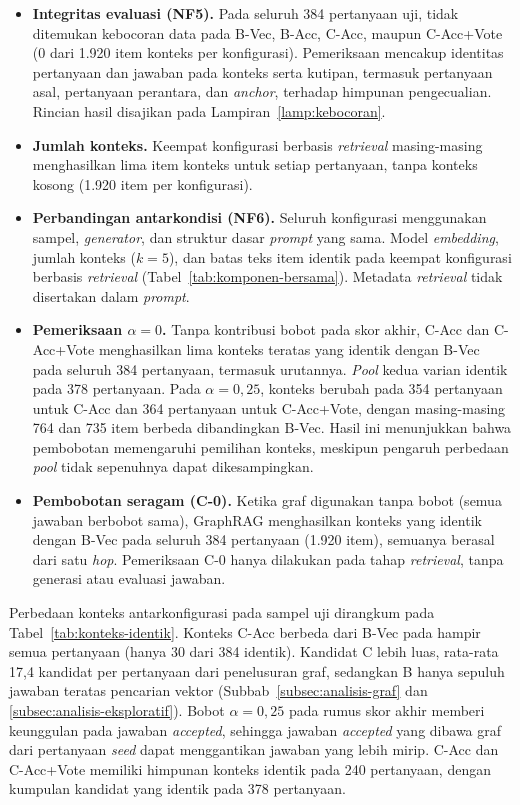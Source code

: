 \begin{itemize}
   \item \textbf{Integritas evaluasi (NF5).} Pada seluruh 384 pertanyaan uji, tidak ditemukan kebocoran data pada B-Vec, B-Acc, C-Acc, maupun C-Acc+Vote (0 dari 1.920 item konteks per konfigurasi). Pemeriksaan mencakup identitas pertanyaan dan jawaban pada konteks serta kutipan, termasuk pertanyaan asal, pertanyaan perantara, dan \emph{anchor}, terhadap himpunan pengecualian. Rincian hasil disajikan pada Lampiran~\ref{lamp:kebocoran}.
   
   \item \textbf{Jumlah konteks.} Keempat konfigurasi berbasis \emph{retrieval} masing-masing menghasilkan lima item konteks untuk setiap pertanyaan, tanpa konteks kosong (1.920 item per konfigurasi).
   
   
   \item \textbf{Perbandingan antarkondisi (NF6).} Seluruh konfigurasi menggunakan sampel, \emph{generator}, dan struktur dasar \emph{prompt} yang sama. Model \emph{embedding}, jumlah konteks ($k=5$), dan batas teks item identik pada keempat konfigurasi berbasis \emph{retrieval} (Tabel~\ref{tab:komponen-bersama}). Metadata \emph{retrieval} tidak disertakan dalam \emph{prompt}.
   
   \item \textbf{Pemeriksaan $\alpha=0$.} Tanpa kontribusi bobot pada skor akhir, C-Acc dan C-Acc+Vote menghasilkan lima konteks teratas yang identik dengan B-Vec pada seluruh 384 pertanyaan, termasuk urutannya. \emph{Pool} kedua varian identik pada 378 pertanyaan. Pada $\alpha=0{,}25$, konteks berubah pada 354 pertanyaan untuk C-Acc dan 364 pertanyaan untuk C-Acc+Vote, dengan masing-masing 764 dan 735 item berbeda dibandingkan B-Vec. Hasil ini menunjukkan bahwa pembobotan memengaruhi pemilihan konteks, meskipun pengaruh perbedaan \emph{pool} tidak sepenuhnya dapat dikesampingkan.
  
   \item \textbf{Pembobotan seragam (C-0).} Ketika graf digunakan tanpa bobot (semua jawaban berbobot sama), GraphRAG menghasilkan konteks yang identik dengan B-Vec pada seluruh 384 pertanyaan (1.920 item), semuanya berasal dari satu \emph{hop}. Pemeriksaan C-0 hanya dilakukan pada tahap \emph{retrieval}, tanpa generasi atau evaluasi jawaban.
\end{itemize}

Perbedaan konteks antarkonfigurasi pada sampel uji dirangkum pada Tabel~\ref{tab:konteks-identik}. Konteks C-Acc berbeda dari B-Vec pada hampir semua pertanyaan (hanya 30 dari 384 identik). Kandidat C lebih luas, rata-rata 17,4 kandidat per pertanyaan dari penelusuran graf, sedangkan B hanya sepuluh jawaban teratas pencarian vektor (Subbab~\ref{subsec:analisis-graf} dan \ref{subsec:analisis-eksploratif}). Bobot $\alpha=0{,}25$ pada rumus skor akhir memberi keunggulan pada jawaban \emph{accepted}, sehingga jawaban \emph{accepted} yang dibawa graf dari pertanyaan \emph{seed} dapat menggantikan jawaban yang lebih mirip. C-Acc dan C-Acc+Vote memiliki himpunan konteks identik pada 240 pertanyaan, dengan kumpulan kandidat yang identik pada 378 pertanyaan.

